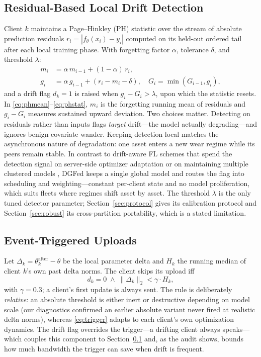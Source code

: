 \documentclass[journal]{IEEEtran}
\newcommand{\dgfed}{DGFed}
\begin{document}
\subsection{Residual-Based Local Drift Detection}\label{sec:detector}
Client $k$ maintains a Page--Hinkley (PH) statistic over the stream of absolute prediction residuals $r_i = |f_\theta(x_i) - y_i|$ computed on its held-out ordered tail after each local training phase. With forgetting factor $\alpha$, tolerance $\delta$, and threshold $\lambda$:
\begin{align}
m_i &= \alpha\, m_{i-1} + (1-\alpha)\, r_i, \label{eq:phmean}\\
g_i &= \alpha\, g_{i-1} + (r_i - m_i - \delta), \quad G_i = \min(G_{i-1}, g_i), \label{eq:phstat}
\end{align}
and a drift flag $d_k = 1$ is raised when $g_i - G_i > \lambda$, upon which the statistic resets. In \eqref{eq:phmean}--\eqref{eq:phstat}, $m_i$ is the forgetting running mean of residuals and $g_i - G_i$ measures sustained upward deviation. Two choices matter. Detecting on residuals rather than inputs flags \emph{target} drift---the model actually degrading---and ignores benign covariate wander. Keeping detection local matches the asynchronous nature of degradation: one asset enters a new wear regime while its peers remain stable. In contrast to drift-aware FL schemes that spend the detection signal on server-side optimizer adaptation \cite{panchal2023flash} or on maintaining multiple clustered models \cite{jothimurugesan2023}, \dgfed{} keeps a single global model and routes the flag into scheduling and weighting---constant per-client state and no model proliferation, which suits fleets where regimes shift asset by asset. The threshold $\lambda$ is the only tuned detector parameter; Section~\ref{sec:protocol} gives its calibration protocol and Section~\ref{sec:robust} its cross-partition portability, which is a stated limitation.

\subsection{Event-Triggered Uploads}\label{sec:trigger}
Let $\Delta_k = \theta_k^{\text{after}} - \theta$ be the local parameter delta and $H_k$ the running median of client $k$'s own past delta norms. The client skips its upload iff
\begin{equation}\label{eq:trigger}
d_k = 0 \;\wedge\; \lVert \Delta_k \rVert_2 < \gamma \cdot H_k,
\end{equation}
with $\gamma = 0.3$; a client's first update is always sent. The rule is deliberately \emph{relative}: an absolute threshold is either inert or destructive depending on model scale (our diagnostics confirmed an earlier absolute variant never fired at realistic delta norms), whereas \eqref{eq:trigger} adapts to each client's own optimization dynamics. The drift flag overrides the trigger---a drifting client always speaks---which couples this component to Section~\ref{sec:detector} and, as the audit shows, bounds how much bandwidth the trigger can save when drift is frequent.
\end{document}
